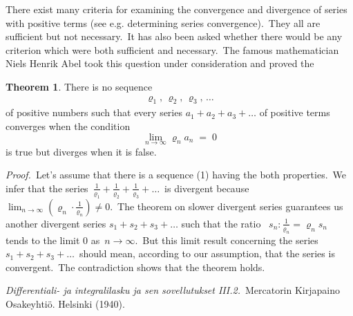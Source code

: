 \documentclass[12pt]{article}
\theoremstyle{definition}
\newtheorem*{thmplain}{Theorem}
\begin{document}
   \PMlinkescapeword{}

There exist many criteria for examining the convergence and divergence of series with positive terms (see e.g. determining series convergence).\, They all are sufficient but not necessary.\, It has also been asked whether there would be any criterion which were both sufficient and necessary.\, The famous mathematician Niels Henrik Abel took this question under consideration and proved the

\begin{thmplain}
There is no sequence
\begin{align}
   \varrho_1,\,\varrho_2,\,\varrho_3,\,\ldots
\end{align}
of positive numbers such that every series\; $a_1+a_2+a_3+\ldots$\; of positive terms converges when the condition
$$\lim_{n\to\infty}\varrho_n a_n \;=\; 0$$
is true but diverges when it is false.
\end{thmplain}

{\em Proof.}\, Let's assume that there is a sequence (1) having the both properties.\, We infer that the series\, $\frac{1}{\varrho_1}\!+\!\frac{1}{\varrho_2}\!+\!\frac{1}{\varrho_3}\!+\ldots$\, is divergent because\, $\lim_{n\to\infty}(\varrho_n\!\cdot\!\frac{1}{\varrho_n}) \ne 0$.\, The theorem on slower divergent series guarantees us another divergent series $s_1\!+\!s_2\!+\!s_3\!+\ldots$ such that the ratio \, $s_n\colon\!\frac{1}{\varrho_n} = 
\varrho_n s_n$\, tends to the limit $0$ as\, $n\to\infty$.\, But this limit result concerning the series\, $s_1\!+\!s_2\!+\!s_3\!+\ldots$\, should mean, according to our assumption, that the series is convergent.\, The contradiction shows that the theorem holds.

\begin{thebibliography}{9}
  {\em Differentiali- ja integralilasku ja sen sovellutukset III.2.}\, Mercatorin Kirjapaino Osakeyhti\"o. Helsinki (1940).
\end{thebibliography}

\end{document}
